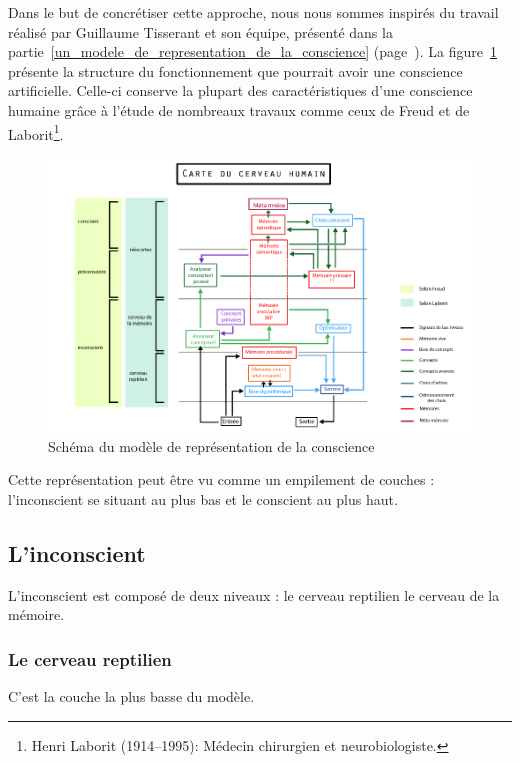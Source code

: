 Dans le but de concrétiser cette approche, nous nous sommes inspirés du travail réalisé par \mbox{Guillaume} \mbox{Tisserant} et son équipe, présenté dans la partie~\ref{un_modele_de_representation_de_la_conscience} (page~\pageref{un_modele_de_representation_de_la_conscience}). La figure~\ref{modele_original} présente la structure du fonctionnement que pourrait avoir une conscience artificielle. Celle-ci conserve la plupart des caractéristiques d’une conscience humaine grâce à l'étude de nombreaux travaux comme ceux de Freud et de Laborit\footnote{Henri Laborit (1914--1995): Médecin chirurgien et neurobiologiste.}.

\begin{figure}[H] 
\centering
\includegraphics[width=\textwidth]{files/modele_original} 
\caption{Schéma du modèle de représentation de la conscience} 
\label{modele_original}
\end{figure}

Cette représentation peut être vu comme un empilement de couches : l'inconscient se situant au plus bas et le conscient au plus haut.

\subsection{L'inconscient}
L'inconscient est composé de deux niveaux : le cerveau reptilien le cerveau de
la mémoire.

\subsubsection{Le cerveau reptilien}

C'est la couche la plus basse du modèle.


